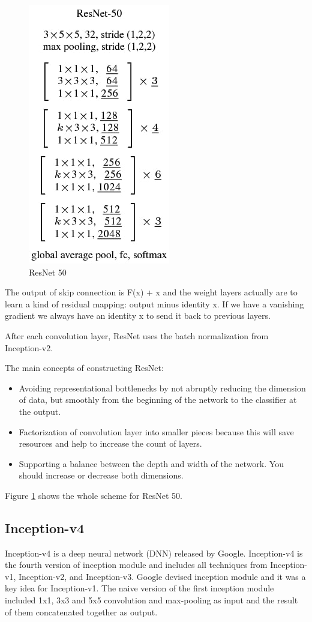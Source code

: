 \documentclass[titlepage]{report}
\begin{document}
\begin{figure}
\centering
\includegraphics[scale=0.5]{resnet_2}
\caption{ResNet 50}
\label{fig:resnet_50}
\end{figure}

The output of skip connection is  F(x) + x and the weight layers actually are to learn a kind of residual mapping: output minus identity x. If we have a vanishing gradient we always have an identity x to send it back to previous layers. 

After each convolution layer, ResNet uses the batch normalization from Inception-v2. 

The main concepts of constructing ResNet:
\begin{itemize}
\item Avoiding representational bottlenecks by not abruptly reducing the dimension of data, but smoothly from the beginning of the network to the classifier at the output.
\item Factorization of convolution layer into smaller pieces because this will save resources and help to increase the count of layers.
\item Supporting a balance between the depth and width of the network. You should increase or decrease both dimensions.
\end{itemize}

Figure \ref{fig:resnet_50} shows the whole scheme for ResNet 50.

\subsection{Inception-v4}
Inception-v4 is a deep neural network (DNN) released by Google. Inception-v4 is the fourth version of inception module and includes all techniques from Inception-v1, Inception-v2, and Inception-v3. Google devised inception module and it was a key idea for Inception-v1. The naive version of the first inception module included 1x1, 3x3 and 5x5 convolution and max-pooling as input and the result of them concatenated together as output.
\end{document}
